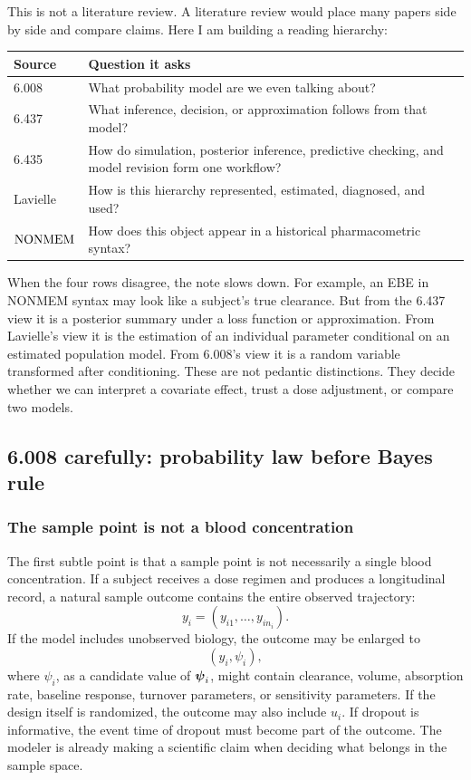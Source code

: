 This is not a literature review.  A literature review would place many papers side by side and compare claims.  Here I am building a reading hierarchy:
\begin{center}
\begin{tabularx}{0.96\textwidth}{p{}X}
\toprule
Source & Question it asks \\
\midrule
6.008 & What probability model are we even talking about? \\
6.437 & What inference, decision, or approximation follows from that model? \\
6.435 & How do simulation, posterior inference, predictive checking, and model revision form one workflow? \\
Lavielle & How is this hierarchy represented, estimated, diagnosed, and used? \\
\(\mathrm{NONMEM}\) & How does this object appear in a historical pharmacometric syntax? \\
\bottomrule
\end{tabularx}
\end{center}
When the four rows disagree, the note slows down.  For example, an EBE in NONMEM syntax may look like a subject's true clearance.  But from the 6.437 view it is a posterior summary under a loss function or approximation.  From Lavielle's view it is the estimation of an individual parameter conditional on an estimated population model.  From 6.008's view it is a random variable transformed after conditioning.  These are not pedantic distinctions.  They decide whether we can interpret a covariate effect, trust a dose adjustment, or compare two models.

\subsection{6.008 carefully: probability law before Bayes rule}

\subsubsection*{The sample point is not a blood concentration}

The first subtle point is that a sample point is not necessarily a single blood concentration.  If a subject receives a dose regimen and produces a longitudinal record, a natural sample outcome contains the entire observed trajectory:
\[
  y_i=(y_{i1},\ldots,y_{in_i}).
\]
If the model includes unobserved biology, the outcome may be enlarged to
\[
  (y_i,\psi_i),
\]
where \(\psi_i\), as a candidate value of \(\boldsymbol{\psi}_i\), might contain clearance, volume, absorption rate, baseline response, turnover parameters, or sensitivity parameters.  If the design itself is randomized, the outcome may also include \(u_i\).  If dropout is informative, the event time of dropout must become part of the outcome.  The modeler is already making a scientific claim when deciding what belongs in the sample space.


